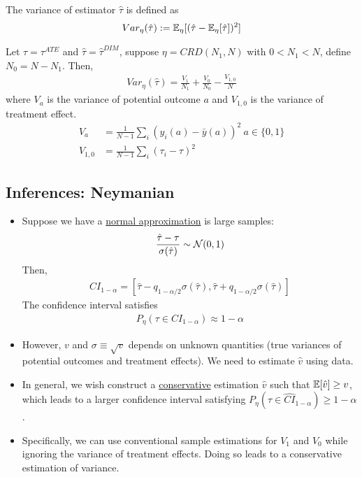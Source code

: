 \documentclass[11pt]{article}
\newcommand{\tauhat}[0]{\hat{\tau}}
\begin{document}
	\begin{definition}
		The variance of estimator $\hat{\tau}$ is defined as
		\begin{align}
			Var_\eta(\hat{\tau}) := \mathbb{E}_\eta [(\hat{\tau} - \mathbb{E}_\eta[\hat{\tau}])^2]
		\end{align}
	\end{definition}
	
	\begin{proposition}
		Let $\tau = \tau^{ATE}$ and $\hat{\tau} = \hat{\tau}^{DIM}$, suppose $\eta = CRD(N_1, N)$ with $0 < N_1 < N$, define $N_0 = N - N_1$. Then,
		\begin{align}
			Var_\eta(\hat{\tau}) = \frac{V_1}{N_1} + \frac{V_0}{N_0} - \frac{V_{1,0}}{N}
		\end{align}
		where $V_a$ is the variance of potential outcome $a$ and $V_{1,0}$ is the variance of treatment effect.
		\begin{align}
			V_{a}&=\frac{1}{N-1} \sum_i \left(y_{i}(a)-\bar{y}(a)\right)^2\ a \in \{0, 1\} \\
			V_{1,0} &= \frac{1}{N-1} \sum_{i}\left(\tau_{i}-\tau\right)^2
		\end{align}
	\end{proposition}
	
	\subsection{Inferences: Neymanian}
	\begin{itemize}
		\item Suppose we have a \ul{normal approximation} is large samples:
		\begin{align}
			\frac{\hat{\tau} - \tau}{\sigma(\hat{\tau})} \sim \mathcal{{N}}(0, 1)	
		\end{align}
		Then,
		\begin{align}
			CI_{1-\alpha} = [\tauhat - q_{1-\alpha/2} \sigma(\tauhat), \tauhat + q_{1-\alpha/2} \sigma(\tauhat)]
		\end{align}
		The confidence interval satisfies
		\begin{align}
			P_\eta (\tau \in CI_{1-\alpha}) \approx 1 - \alpha
		\end{align}
		\item However, $v$ and $\sigma \equiv \sqrt{v}$ depends on unknown quantities (true variances of potential outcomes and treatment effects). We need to estimate $\hat{v}$ using data.
		\item In general, we wish construct a \ul{conservative} estimation $\hat{v}$ such that $\mathbb{E}[\hat{v}] \geq v$, which leads to a larger confidence interval satisfying $P_\eta(\tau \in \hat{CI}_{1-\alpha}) \geq 1 - \alpha$.
		\item Specifically, we can use conventional sample estimations for $V_1$ and $V_0$ while ignoring the variance of treatment effects. Doing so leads to a conservative estimation of variance.
	\end{itemize}
	
\end{document}
